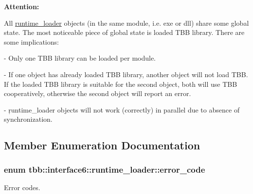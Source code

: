 {\bfseries Attention\+:} 

All {\ttfamily \hyperlink{classtbb_1_1interface6_1_1runtime__loader}{runtime\+\_\+loader}} objects (in the same module, i.\+e. exe or dll) share some global state. The most noticeable piece of global state is loaded T\+B\+B library. There are some implications\+: \begin{DoxyVerb}-   Only one TBB library can be loaded per module.

-   If one object has already loaded TBB library, another object will not load TBB.
    If the loaded TBB library is suitable for the second object, both will use TBB
    cooperatively, otherwise the second object will report an error.

-   \c runtime_loader objects will not work (correctly) in parallel due to absence of
    synchronization.\end{DoxyVerb}
 

\subsection{Member Enumeration Documentation}
\hypertarget{classtbb_1_1interface6_1_1runtime__loader_a264674772d9f4240d89aa9d939c1eef7}{}
\subsubsection[{error\+\_\+code}]{\setlength{\rightskip}{0pt plus 5cm}enum {\bf tbb\+::interface6\+::runtime\+\_\+loader\+::error\+\_\+code}}\label{classtbb_1_1interface6_1_1runtime__loader_a264674772d9f4240d89aa9d939c1eef7}


Error codes. 

